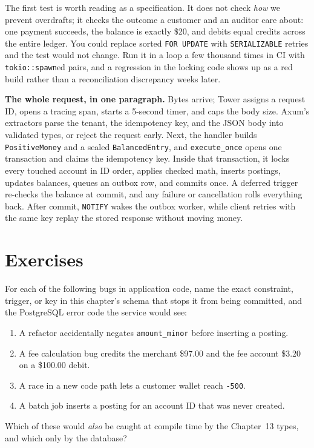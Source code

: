 The first test is worth reading as a specification. It does not check \emph{how} we prevent overdrafts; it checks the outcome a customer and an auditor care about: one payment succeeds, the balance is exactly \$20, and debits equal credits across the entire ledger. You could replace sorted \texttt{FOR UPDATE} with \texttt{SERIALIZABLE} retries and the test would not change. Run it in a loop a few thousand times in CI with \texttt{tokio::spawn}ed pairs, and a regression in the locking code shows up as a red build rather than a reconciliation discrepancy weeks later.

\begin{focusbox}
\textbf{The whole request, in one paragraph.} Bytes arrive; Tower assigns a request ID, opens a tracing span, starts a 5-second timer, and caps the body size. Axum's extractors parse the tenant, the idempotency key, and the JSON body into validated types, or reject the request early. Next, the handler builds \texttt{PositiveMoney} and a sealed \texttt{BalancedEntry}, and \texttt{execute\_once} opens one transaction and claims the idempotency key. Inside that transaction, it locks every touched account in ID order, applies checked math, inserts postings, updates balances, queues an outbox row, and commits once. A deferred trigger re-checks the balance at commit, and any failure or cancellation rolls everything back. After commit, \texttt{NOTIFY} wakes the outbox worker, while client retries with the same key replay the stored response without moving money.
\end{focusbox}

\section{Exercises}
\label{ch14:exercises}

\begin{exercise}
For each of the following bugs in application code, name the exact constraint, trigger, or key in this chapter's schema that stops it from being committed, and the PostgreSQL error code the service would see:
\begin{enumerate}
  \item A refactor accidentally negates \texttt{amount\_minor} before inserting a posting.
  \item A fee calculation bug credits the merchant \$97.00 and the fee account \$3.20 on a \$100.00 debit.
  \item A race in a new code path lets a customer wallet reach \texttt{-500}.
  \item A batch job inserts a posting for an account ID that was never created.
\end{enumerate}
Which of these would \emph{also} be caught at compile time by the Chapter~13 types, and which only by the database?
\end{exercise}

